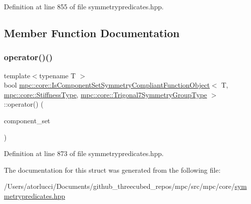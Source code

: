 Definition at line 855 of file symmetrypredicates.\+hpp.



\subsection{Member Function Documentation}
\mbox{\label{structmpc_1_1core_1_1_is_component_set_symmetry_compliant_function_object_3_01_t_00_01mpc_1_1corbe0c5d4e21105c144a825f64d1e00184_ac63d8d09964def15a85afc9291ff55da}} 
\subsubsection{\texorpdfstring{operator()()}{operator()()}}
{\footnotesize\ttfamily template$<$typename T $>$ \\
bool \mbox{\hyperlink{structmpc_1_1core_1_1_is_component_set_symmetry_compliant_function_object}{mpc\+::core\+::\+Is\+Component\+Set\+Symmetry\+Compliant\+Function\+Object}}$<$ T, \mbox{\hyperlink{structmpc_1_1core_1_1_stiffness_type}{mpc\+::core\+::\+Stiffness\+Type}}, \mbox{\hyperlink{structmpc_1_1core_1_1_trigonal7_symmetry_group_type}{mpc\+::core\+::\+Trigonal7\+Symmetry\+Group\+Type}} $>$\+::operator() (\begin{DoxyParamCaption}\item[{const std\+::set$<$ \mbox{\hyperlink{namespacempc_1_1core_ac3a232afc7c680d580628e834030482f}{mpc\+::core\+::\+Tensor\+Rank4\+Component}}$<$ T $>$ $>$ \&}]{component\+\_\+set }\end{DoxyParamCaption})\hspace{0.3cm}{\ttfamily [inline]}}



Definition at line 873 of file symmetrypredicates.\+hpp.



The documentation for this struct was generated from the following file\+:\begin{DoxyCompactItemize}
\item 
/\+Users/atorlucci/\+Documents/github\+\_\+threecubed\+\_\+repos/mpc/src/mpc/core/\mbox{\hyperlink{symmetrypredicates_8hpp}{symmetrypredicates.\+hpp}}\end{DoxyCompactItemize}
